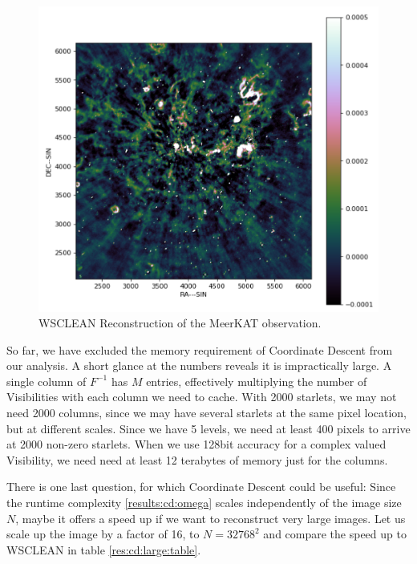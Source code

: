 \begin{figure}[h]
	\centering
	\includegraphics[width=0.6\linewidth]{./chapters/20.results/meerkat.png}
	\caption{WSCLEAN Reconstruction of the MeerKAT observation.}
	\label{scale:wsclean}
\end{figure}

So far, we have excluded the memory requirement of Coordinate Descent from our analysis. A short glance at the numbers reveals it is impractically large. A single column of $F^{-1}$ has $M$ entries, effectively multiplying the number of Visibilities with each column we need to cache. With 2000 starlets, we may not need 2000 columns, since we may have several starlets at the same pixel location, but at different scales. Since we have 5 levels, we need at least 400 pixels to arrive at 2000 non-zero starlets. When we use 128bit accuracy for a complex valued Visibility, we need need at least 12 terabytes of memory just for the columns.

There is one last question, for which Coordinate Descent could be useful: Since the runtime complexity \eqref{results:cd:omega} scales independently of the image size $N$, maybe it offers a speed up if we want to reconstruct very large images. Let us scale up the image by a factor of 16, to $N=32768^2$ and compare the speed up to WSCLEAN in table \ref{res:cd:large:table}. 

